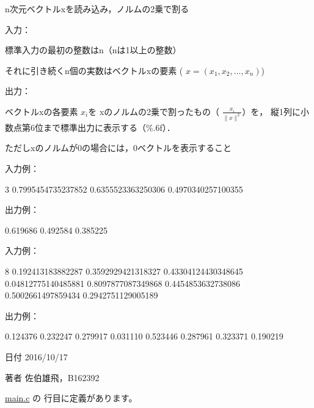 n次元ベクトルxを読み込み，ノルムの2乗で割る 

入力：
\begin{DoxyItemize}
\item 標準入力の最初の整数はn（nは1以上の整数）
\item それに引き続くn個の実数はベクトルxの要素 ( $x = (x_1, x_2, \ldots, x_n) $)
\end{DoxyItemize}

出力：
\begin{DoxyItemize}
\item ベクトルxの各要素 $x_i$を xのノルムの2乗で割ったもの（ $ \frac{x_i}{\| x \|^2} $）を， 縦1列に小数点第6位まで標準出力に表示する（\%.6f）．
\item ただしxのノルムが0の場合には，0ベクトルを表示すること
\end{DoxyItemize}

入力例： \begin{DoxyVerb}3 0.7995454735237852 0.6355523363250306 0.4970340257100355
\end{DoxyVerb}
 出力例： \begin{DoxyVerb}0.619686
0.492584
0.385225
\end{DoxyVerb}
 入力例： \begin{DoxyVerb}8 0.192413183882287 0.3592929421318327 0.43304124430348645 0.04812775140485881
0.8097877087349868 0.4454853632738086 0.5002661497859434 0.2942751129005189
\end{DoxyVerb}
 出力例： \begin{DoxyVerb}0.124376
0.232247
0.279917
0.031110
0.523446
0.287961
0.323371
0.190219
\end{DoxyVerb}
 \begin{DoxyDate}{日付}
2016/10/17 
\end{DoxyDate}
\begin{DoxyAuthor}{著者}
佐伯雄飛，\-B162392 
\end{DoxyAuthor}


 \hyperlink{main_8c_source}{main.\-c} の  行目に定義があります。


